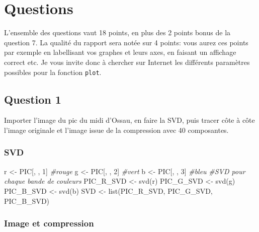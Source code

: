 \documentclass[
]{article}
\newenvironment{Shaded}{\begin{snugshade}}{\end{snugshade}}
\newcommand{\CommentTok}[1]{\textcolor[rgb]{0.56,0.35,0.01}{\textit{#1}}}
\newcommand{\DecValTok}[1]{\textcolor[rgb]{0.00,0.00,0.81}{#1}}
\newcommand{\FunctionTok}[1]{\textcolor[rgb]{0.00,0.00,0.00}{#1}}
\newcommand{\NormalTok}[1]{#1}
\newcommand{\OtherTok}[1]{\textcolor[rgb]{0.56,0.35,0.01}{#1}}
\begin{document}
\hypertarget{questions}{%
\section{Questions}\label{questions}}

L'ensemble des questions vaut 18 points, en plus des 2 points bonus de
la question 7. La qualité du rapport sera notée sur 4 points: vous aurez
ces points par exemple en labellisant vos graphes et leurs axes, en
faisant un affichage correct etc. Je vous invite donc à chercher sur
Internet les différents paramètres possibles pour la fonction
\texttt{plot}.

\hypertarget{question-1}{%
\subsection{Question 1}\label{question-1}}

Importer l'image du pic du midi d'Ossau, en faire la SVD, puis tracer
côte à côte l'image originale et l'image issue de la compression avec 40
composantes.

\hypertarget{svd}{%
\subsubsection{SVD}\label{svd}}

\begin{Shaded}
\begin{Highlighting}[]
\NormalTok{r }\OtherTok{\textless{}{-}}\NormalTok{ PIC[, , }\DecValTok{1}\NormalTok{] }\CommentTok{\#rouge}
\NormalTok{g }\OtherTok{\textless{}{-}}\NormalTok{ PIC[, , }\DecValTok{2}\NormalTok{] }\CommentTok{\#vert}
\NormalTok{b }\OtherTok{\textless{}{-}}\NormalTok{ PIC[, , }\DecValTok{3}\NormalTok{] }\CommentTok{\#bleu}
\CommentTok{\#SVD pour chaque bande de couleurs}
\NormalTok{PIC\_R\_SVD }\OtherTok{\textless{}{-}} \FunctionTok{svd}\NormalTok{(r)}
\NormalTok{PIC\_G\_SVD }\OtherTok{\textless{}{-}} \FunctionTok{svd}\NormalTok{(g)}
\NormalTok{PIC\_B\_SVD }\OtherTok{\textless{}{-}} \FunctionTok{svd}\NormalTok{(b)}
\NormalTok{SVD }\OtherTok{\textless{}{-}} \FunctionTok{list}\NormalTok{(PIC\_R\_SVD, PIC\_G\_SVD, PIC\_B\_SVD)}
\end{Highlighting}
\end{Shaded}

\hypertarget{image-et-compression}{%
\subsubsection{Image et compression}\label{image-et-compression}}
\end{document}
